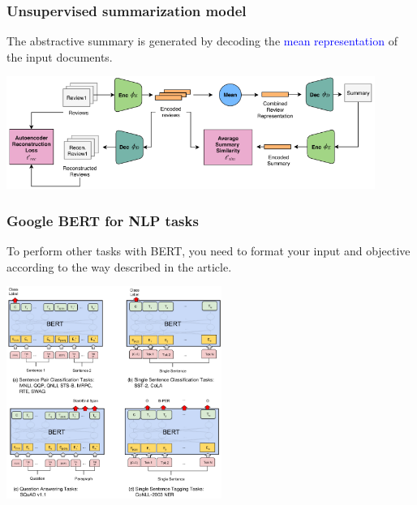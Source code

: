 \documentclass[9pt]{beamer}
\begin{document}
\begin{frame}
  \frametitle{Unsupervised summarization model}

  The abstractive summary is generated by decoding the
  \textcolor{blue}{mean representation} of the input documents.

  \begin{center}
    \includegraphics[width = 12cm]{images/unsupervised_summarization_model.png}
  \end{center}
\end{frame}

\begin{frame}
  \frametitle{Google BERT for NLP tasks}

  To perform other tasks with BERT, you need to format your input and
  objective according to the way described in the article.

  \begin{center}
    \includegraphics[width = 7cm]{images/bert.png}
  \end{center}
\end{frame}
\end{document}

